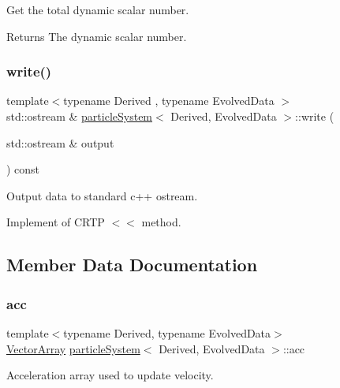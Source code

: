 Get the total dynamic scalar number. 

\begin{DoxyReturn}{Returns}
The dynamic scalar number. 
\end{DoxyReturn}
\mbox{\label{classparticle_system_a7f37791caaafd35f6c2d7afcc2a49b34}} 
\subsubsection{\texorpdfstring{write()}{write()}}
{\footnotesize\ttfamily template$<$typename Derived , typename Evolved\+Data $>$ \\
std\+::ostream \& \mbox{\hyperlink{classparticle_system}{particle\+System}}$<$ Derived, Evolved\+Data $>$\+::write (\begin{DoxyParamCaption}\item[{std\+::ostream \&}]{output }\end{DoxyParamCaption}) const}



Output data to standard c++ ostream. 

Implement of C\+R\+TP \textquotesingle{}$<$$<$\textquotesingle{} method. 

\subsection{Member Data Documentation}
\mbox{\label{classparticle_system_ad7e503534c878abae38d4b06f50286fb}} 
\subsubsection{\texorpdfstring{acc}{acc}}
{\footnotesize\ttfamily template$<$typename Derived, typename Evolved\+Data$>$ \\
\mbox{\hyperlink{classparticle_system_a6f66ed187a286c0d42ab2f83b8b6193b}{Vector\+Array}} \mbox{\hyperlink{classparticle_system}{particle\+System}}$<$ Derived, Evolved\+Data $>$\+::acc\hspace{0.3cm}{\ttfamily [protected]}}



Acceleration array used to update velocity. 

